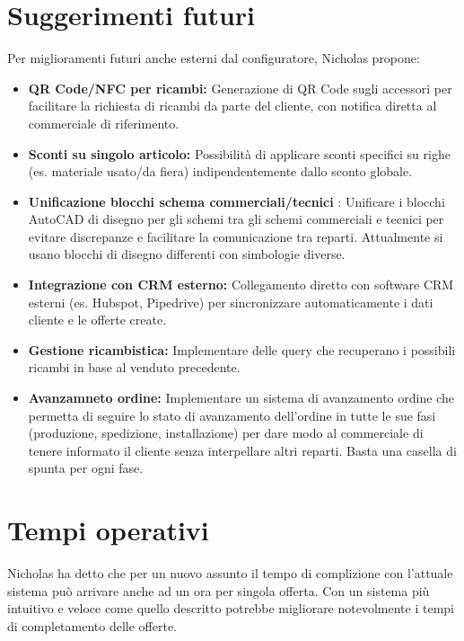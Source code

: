 \documentclass[12pt, a4paper]{article} %
\begin{document}
\section{Suggerimenti futuri}
Per miglioramenti futuri anche esterni dal configuratore, Nicholas propone:
\begin{itemize}
      \item \textbf{QR Code/NFC per ricambi:} Generazione di QR Code sugli accessori per facilitare la
            richiesta di ricambi da parte del cliente, con notifica diretta al commerciale di riferimento.
      \item \textbf{Sconti su singolo articolo:} Possibilità di applicare sconti specifici su righe (es. materiale usato/da fiera)
            indipendentemente dallo sconto globale.
      \item \textbf{Unificazione blocchi schema commerciali/tecnici} : Unificare i blocchi AutoCAD di disegno per gli schemi tra gli schemi commerciali e tecnici
            per evitare discrepanze e facilitare la comunicazione tra reparti.
            Attualmente si usano blocchi di disegno differenti con simbologie diverse.
      \item \textbf{Integrazione con CRM esterno:} Collegamento diretto con software CRM esterni (es. Hubspot, Pipedrive)
            per sincronizzare automaticamente i dati cliente e le offerte create.
      \item \textbf{Gestione ricambistica:} Implementare delle query che recuperano i possibili ricambi in base al venduto precedente.
      \item \textbf{Avanzamneto ordine:} Implementare un sistema di avanzamento ordine che permetta di seguire lo stato di avanzamento
            dell'ordine in tutte le sue fasi (produzione, spedizione, installazione) per dare modo al commerciale di tenere
            informato il cliente senza interpellare altri reparti. Basta una casella di spunta per ogni fase.
\end{itemize}

\section{Tempi operativi}
Nicholas ha detto che per un nuovo assunto il tempo di complizione con
l'attuale sistema può arrivare anche ad un ora per singola offerta. Con un
sistema più intuitivo e veloce come quello descritto potrebbe migliorare
notevolmente i tempi di completamento delle offerte.
\end{document}
